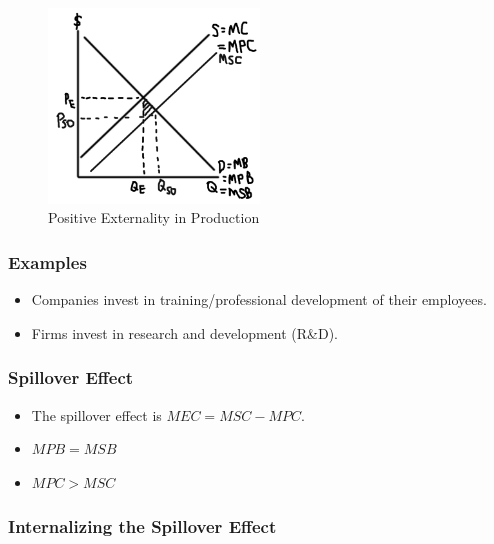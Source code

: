 \documentclass[
  letterpaper,
  DIV=11,
  numbers=noendperiod]{scrartcl}
\providecommand{\tightlist}{%
  \setlength{\itemsep}{0pt}\setlength{\parskip}{0pt}}\usepackage{longtable,booktabs,array}
\begin{document}
\begin{figure}[H]

{\centering \includegraphics[width=0.5\textwidth,height=\textheight]{img/pos-prod.png}

}

\caption{Positive Externality in Production}

\end{figure}%

\subsubsection{Examples}\label{examples-4}

\begin{itemize}
\tightlist
\item
  Companies invest in training/professional development of their
  employees.
\item
  Firms invest in research and development (R\&D).
\end{itemize}

\subsubsection{Spillover Effect}\label{spillover-effect-2}

\begin{itemize}
\tightlist
\item
  The spillover effect is \(MEC = MSC-MPC\).
\item
  \(MPB = MSB\)
\item
  \(MPC > MSC\)
\end{itemize}

\subsubsection{Internalizing the Spillover
Effect}\label{internalizing-the-spillover-effect-2}
\end{document}
